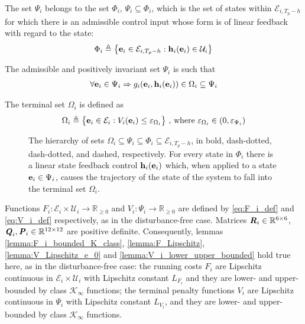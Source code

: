 \begin{bw_box}
  \begin{assumption}
  \label{ass:phi_psi}
  The set $\Psi_i$ belongs to the set $\Phi_i$, $\Psi_i \subseteq \Phi_i$,
  which is the set of states within $\mathcal{E}_{i,T_p-h}$ for which there is an
  admissible control input whose form is of linear feedback with regard to the
  state:
  \begin{align}
    \Phi_i \triangleq \big\{\bm{\mathbf{e}}_i \in \mathcal{E}_{i,T_p-h} : \bm{\mathbf{h}}_i(\bm{\mathbf{e}}_i) \in \mathcal{U}_i \big\}
  \end{align}
  \end{assumption}
\end{bw_box}


\begin{bw_box}
  \begin{assumption}
  \label{ass:psi_omega}
  The admissible and positively invariant set $\Psi_i$ is such that
  \begin{align}
    \forall \bm{\mathbf{e}}_i \in \Psi_i \Rightarrow g_i(\bm{\mathbf{e}}_i, \bm{\mathbf{h}}_i(\bm{\mathbf{e}}_i)) \in \Omega_i \subseteq \Psi_i
  \end{align}
  \end{assumption}
\end{bw_box}

The terminal set $\Omega_i$ is defined as
\begin{align}
  \Omega_i \triangleq \big\{\bm{\mathbf{e}}_i \in \mathcal{E}_i : V_i(\bm{\mathbf{e}}_i)
    \leq \varepsilon_{\Omega_i}\big\}\ \text{, where } \varepsilon_{\Omega_i} \in (0, \varepsilon_{\Psi_i})
\end{align}


\begin{figure}[ht!]
  \centering
  
  \caption{The hierarchy of sets
  $\Omega_i \subseteq \Psi_i \subseteq \Phi_i \subseteq \mathcal{E}_{i,T_p-h}$,
  in bold, dash-dotted, dash-dotted, and dashed, respectively.
  For every state in $\Phi_i$ there is a linear state feedback control
  $\bm{\mathbf{h}}_i(\bm{\mathbf{e}}_i)$ which, when applied to a state
  $\bm{\mathbf{e}}_i \in \Psi_i$, causes the trajectory of the state of the system to
  fall into the terminal set $\Omega_i$.}
\end{figure}


Functions
$F_i : \mathcal{E}_i \times \mathcal{U}_i \to \mathbb{R}_{\geq 0}$ and
$V_i: \Psi_i \to \mathbb{R}_{\geq 0}$ are defined by \eqref{eq:F_i_def}
and \eqref{eq:V_i_def} respectively, as in the disturbance-free case.
Matrices $\bm{\mathit{R}}_i \in \mathbb{R}^{6 \times 6}$,
$\bm{\mathit{Q}}_i, \bm{\mathit{P}}_i \in \mathbb{R}^{12 \times 12}$ are positive definite.
Consequently, lemmas \eqref{lemma:F_i_bounded_K_class},
\eqref{lemma:F_Lipschitz}, \eqref{lemma:V_Lipschitz_e_0} and
\eqref{lemma:V_i_lower_upper_bounded} hold true here, as in the
disturbance-free case: the running costs $F_i$ are Lipschitz continuous in
$\mathcal{E}_i \times \mathcal{U}_i$ with Lipschitz constant $L_{F_i}$ and
they are lower- and upper-bounded by class $\mathcal{K}_{\infty}$ functions;
the terminal penalty functions $V_i$ are Lipschitz continuous in $\Psi_i$
with Lipschitz constant $L_{V_i}$, and they are lower- and upper-bounded
by class $\mathcal{K}_{\infty}$ functions.


